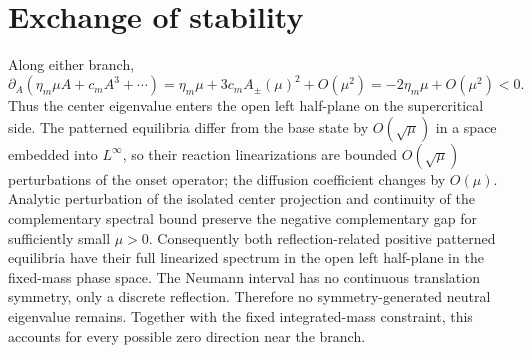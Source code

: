 \section*{Exchange of stability}
Along either branch,
\[
\partial_A(\eta_m\mu A+c_mA^3+\cdots)
=\eta_m\mu+3c_mA_\pm(\mu)^2+O(\mu^2)
=-2\eta_m\mu+O(\mu^2)<0.
\]
Thus the center eigenvalue enters the open left half-plane on the
supercritical side.  The patterned equilibria differ from the base state by
$O(\sqrt\mu)$ in a space embedded into $L^\infty$, so their reaction
linearizations are bounded $O(\sqrt\mu)$ perturbations of the onset operator;
the diffusion coefficient changes by $O(\mu)$.  Analytic perturbation of the
isolated center projection and continuity of the complementary spectral bound
preserve the negative complementary gap for sufficiently small $\mu>0$.
Consequently both reflection-related positive patterned equilibria have their
full linearized spectrum in the open left half-plane in the fixed-mass phase
space.
The Neumann interval has no continuous translation symmetry, only a discrete
reflection.  Therefore no symmetry-generated neutral eigenvalue remains.
Together with the fixed integrated-mass constraint, this accounts for every
possible zero direction near the branch.
